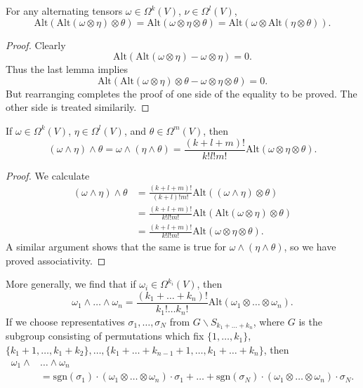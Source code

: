 \begin{lemma}
    For any alternating tensors $\omega \in \Omega^k(V)$, $\nu \in \Omega^l(V)$,
    \[ \text{Alt}(\text{Alt}(\omega \otimes \eta) \otimes \theta) = \text{Alt}(\omega \otimes \eta \otimes \theta) = \text{Alt}(\omega \otimes \text{Alt}(\eta \otimes \theta)). \]
\end{lemma}
\begin{proof}
    Clearly
    \[ \text{Alt}(\text{Alt}(\omega \otimes \eta) - \omega \otimes \eta) = 0. \]
    Thus the last lemma implies
    \[ \text{Alt}(\text{Alt}(\omega \otimes \eta) \otimes \theta - \omega \otimes \eta \otimes \theta) = 0. \]
    But rearranging completes the proof of one side of the equality to be proved. The other side is treated similarily.
\end{proof}

\begin{theorem}
    If $\omega \in \Omega^k(V)$, $\eta \in \Omega^l(V)$, and $\theta \in \Omega^m(V)$, then
    \[ (\omega \wedge \eta) \wedge \theta = \omega \wedge (\eta \wedge \theta) = \frac{(k + l + m)!}{k! l! m!} \text{Alt}(\omega \otimes \eta \otimes \theta). \]
\end{theorem}
\begin{proof}
    We calculate
    \begin{align*}
        (\omega \wedge \eta) \wedge \theta &= \frac{(k + l + m)!}{(k + l)! m!} \text{Alt}((\omega \wedge \eta) \otimes \theta)\\
        &= \frac{(k+l+m)!}{k! l! m!} \text{Alt}(\text{Alt}(\omega \otimes \eta) \otimes \theta)\\
        &= \frac{(k+l+m)!}{k! l! m!} \text{Alt}(\omega \otimes \eta \otimes \theta).
    \end{align*}
    A similar argument shows that the same is true for $\omega \wedge (\eta \wedge \theta)$, so we have proved associativity.
\end{proof}

\begin{remark}
    More generally, we find that if $\omega_i \in \Omega^{k_i}(V)$, then
    \[ \omega_1 \wedge \dots \wedge \omega_n = \frac{(k_1 + \dots + k_n)!}{k_1! \dots k_n!} \text{Alt}(\omega_1 \otimes \dots \otimes \omega_n). \]
    If we choose representatives $\sigma_1, \dots, \sigma_N$ from $G \backslash S_{k_1 + \dots + k_n}$, where $G$ is the subgroup consisting of permutations which fix $\{ 1, \dots, k_1 \}$, $\{ k_1 + 1, \dots, k_1 + k_2 \}, \dots, \{ k_1 + \dots + k_{n-1} + 1, \dots, k_1 + \dots + k_n \}$, then
    \begin{align*}
        \omega_1 \wedge& \dots \wedge \omega_n\\
        &= \text{sgn}(\sigma_1) \cdot (\omega_1 \otimes \dots \otimes \omega_n) \cdot \sigma_1 + \dots + \text{sgn}(\sigma_N) \cdot (\omega_1 \otimes \dots \otimes \omega_n) \cdot \sigma_N.
    \end{align*}
\end{remark}

